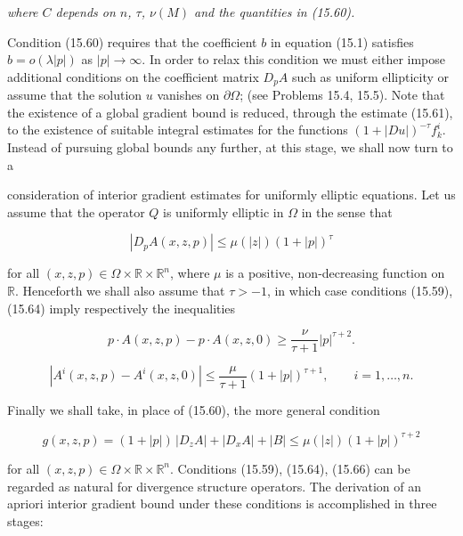 \textit{where $C$ depends on $n$, $\tau$, $\nu(M)$ and the quantities in (15.60).}

Condition (15.60) requires that the coefficient $b$ in equation (15.1) satisfies $b=o(\lambda|p|)$ as $|p|\to\infty$. In order to relax this condition we must either impose additional conditions on the coefficient matrix $D_pA$ such as uniform ellipticity or assume that the solution $u$ vanishes on $\partial\Omega$; (see Problems 15.4, 15.5). Note that the existence of a global gradient bound is reduced, through the estimate (15.61), to the existence of suitable integral estimates for the functions $(1+|Du|)^{-\tau}f^i_k$. Instead of pursuing global bounds any further, at this stage, we shall now turn to a


consideration of interior gradient estimates for uniformly elliptic equations. Let
us assume that the operator $Q$ is uniformly elliptic in $\Omega$ in the sense that

\begin{equation}
|D_p A(x,z,p)| \le \mu(|z|)(1+|p|)^\tau
\tag{15.64}
\end{equation}

for all $(x,z,p)\in \Omega\times \mathbb{R}\times \mathbb{R}^n$, where $\mu$ is a positive, non-decreasing function on $\mathbb{R}$.
Henceforth we shall also assume that $\tau>-1$, in which case conditions (15.59),
(15.64) imply respectively the inequalities

\[
p\cdot A(x,z,p)-p\cdot A(x,z,0)\ge \frac{\nu}{\tau+1}|p|^{\tau+2}.
\]

\begin{equation}
|A^i(x,z,p)-A^i(x,z,0)|\le \frac{\mu}{\tau+1}(1+|p|)^{\tau+1},\qquad i=1,\dots,n.
\tag{15.65}
\end{equation}

Finally we shall take, in place of (15.60), the more general condition

\begin{equation}
g(x,z,p)=(1+|p|)\,|D_z A|+|D_x A|+|B|\le \mu(|z|)(1+|p|)^{\tau+2}
\tag{15.66}
\end{equation}

for all $(x,z,p)\in \Omega\times \mathbb{R}\times \mathbb{R}^n$. Conditions (15.59), (15.64), (15.66) can be regarded
as natural for divergence structure operators. The derivation of an apriori interior
gradient bound under these conditions is accomplished in three stages:


